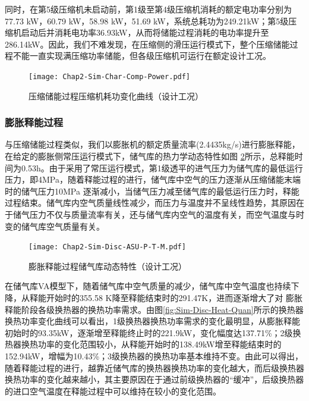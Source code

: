 同时，在第5级压缩机未启动前，第1级至第4级压缩机消耗的额定电功率分别为77.73 kW，60.79 kW，58.98 kW，51.69 kW，系统总耗功为249.21kW；第5级压缩机启动后并消耗电功率36.93kW，从而将储能过程消耗的电功率提升至286.14kW。因此，我们不难发现，在压缩侧的滑压运行模式下，整个压缩储能过程不能一直实现满压缩功率储能，但各级压缩机可运行在额定设计工况。

\begin{figure}[H] %
  \centering
  \texttt{[image: Chap2-Sim-Char-Comp-Power.pdf]}
  \caption{压缩储能过程压缩机耗功变化曲线（设计工况）}
  \label{fig:Sim-Char-Comp-Power}
\end{figure}

\subsubsection{膨胀释能过程}
与压缩储能过程类似，我们以膨胀机的额定质量流率(2.4435kg/s)进行膨胀释能，在给定的膨胀侧常压运行模式下，储气库的热力学动态特性如图
\ref{fig:Sim-Disc-ASU-P-T-M}所示，总释能时间为0.53h。由于采用了常压运行模式，第1级透平的进气压力为储气库的最低运行压力，即4MPa，随着释能过程的进行，储气库中空气的压力逐渐从压缩储能末端时的储气压力10MPa 逐渐减小，当储气压力减至储气库的最低运行压力时，释能过程结束。储气库内空气质量线性减少，而压力与温度并不呈线性趋势，其原因在于储气压力不仅与质量流率有关，还与储气库内空气的温度有关，而空气温度与时变的储气库空气质量有关。

\begin{figure}[H] %
  \centering
  \texttt{[image: Chap2-Sim-Disc-ASU-P-T-M.pdf]}
  \caption{膨胀释能过程储气库动态特性（设计工况）}
  \label{fig:Sim-Disc-ASU-P-T-M}
\end{figure}

在储气库VA模型下，随着储气库中空气质量的减少，储气库中空气温度也持续下降，从释能开始时的355.58 K降至释能结束时的291.47K，进而逐渐增大了对
膨胀释能阶段各级换热器的换热功率需求。由图\ref{fig:Sim-Disc-Heat-Quan}所示的换热器换热功率变化曲线可以看出，1级换热器换热功率需求的变化最明显，从膨胀释能初始时的93.35kW，逐渐增至释能终止时的221.9kW，变化幅度达137.71\%；2级换热器换热功率的变化范围较小，从释能开始时的138.49kW增至释能结束时的152.94kW，增幅为10.43\%；3级换热器的换热功率基本维持不变。由此可以得出，随着释能过程的进行，越靠近储气库的换热器换热功率的变化越大，而后级换热器换热功率的变化越来越小，其主要原因在于通过前级换热器的“缓冲”，后级换热器的进口空气温度在释能过程中可以维持在较小的变化范围。

